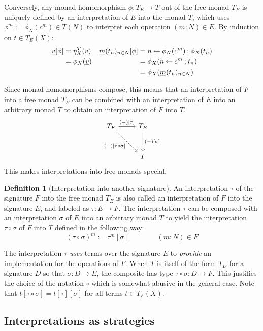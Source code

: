 \documentclass[11pt,oneside]{book}
\theoremstyle{definition}
\newtheorem{definition}[theorem]{Definition}
\newcommand{\ul}[1]{%
  \underline{\smash{#1}}
}
\begin{document}
Conversely,
any monad homomorphism $\phi : T_E \rightarrow T$
out of the free monad $T_E$
is uniquely defined by an interpretation of $E$
into the monad $T$,
which uses $\phi^m := \phi_N(c^m) \in T(N)$
to interpret each operation $(m \mathbin: N) \in E$.
By induction on $t \in T_E(X)$:
\begin{align*}
  \ul{v}[\phi] &= \eta^T_X(v) &
  \ul{m}(t_n)_{n \in N} [\phi]
    &= n \mathbin\leftarrow \phi_N(c^m) \mathbin; \phi_X(t_n)
  \\
    &= \phi_X(\ul{v}) &
    &= \phi_X(n \mathbin\leftarrow c^m \mathbin; t_n)
  \\
    &&
    &= \phi_X(\ul{m}(t_n)_{n \in N})
\end{align*}

Since monad homomorphisms compose,
this means that
an interpretation of $F$ into a free monad $T_E$
can be combined with an interpretation of $E$ into
an arbitrary monad $T$
to obtain an interpretation of $F$ into $T$.
\[
  \begin{tikzcd}[row sep=large]
    T_F \ar[r, "{(-)[\tau]}"] \ar[dr, dashed, "{(-)[\tau \circ \sigma]}"'] &
    T_E \ar[d, "{(-)[\sigma]}"] \\
    & T
  \end{tikzcd}
\]
This makes interpretations into free monads special.

\begin{definition}[Interpretation into another signature]
An interpretation $\tau$ of the signature $F$
into the free monad $T_E$
is also called an interpretation of $F$ into the signature $E$,
and labeled as $\tau : E \rightarrow F$.
The interpretation $\tau$ can be composed with
an interpretation $\sigma$ of $E$ into an arbitrary monad $T$
to yield the interpretation $\tau \circ \sigma$
of $F$ into $T$ defined in the following way:
\[
  (\tau \circ \sigma)^m := \tau^m[\sigma]
  \qquad \qquad
  (m \mathbin: N) \in F
\]
\end{definition}

The interpretation $\tau$ \emph{uses}
terms over the signature $E$
to \emph{provide} an implementation for the operations of $F$.
When $T$ is itself of the form $T_D$ for a signature $D$
so that $\sigma : D \rightarrow E$,
the composite has type $\tau \circ \sigma : D \rightarrow F$.
This justifies the choice of the notation $\circ$
which is somewhat abusive in the general case.
Note that $t[\tau \circ \sigma] = t[\tau][\sigma]$
for all terms $t \in T_F(X)$.


\subsection{Interpretations as strategies} \label{sec:monadstrat} %
\end{document}
